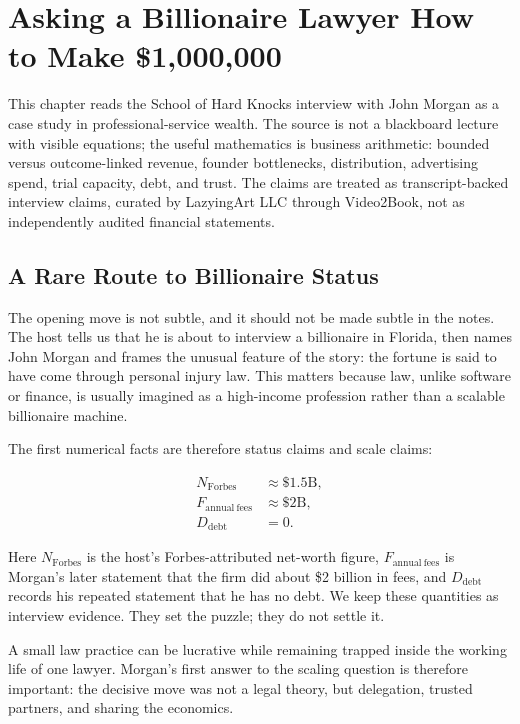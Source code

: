 \chapter{Asking a Billionaire Lawyer How to Make \$1,000,000}

This chapter reads the School of Hard Knocks interview with John Morgan as a case study in professional-service wealth. The source is not a blackboard lecture with visible equations; the useful mathematics is business arithmetic: bounded versus outcome-linked revenue, founder bottlenecks, distribution, advertising spend, trial capacity, debt, and trust. The claims are treated as transcript-backed interview claims, curated by LazyingArt LLC through Video2Book, not as independently audited financial statements.

\section{A Rare Route to Billionaire Status}

The opening move is not subtle, and it should not be made subtle in the notes. The host tells us that he is about to interview a billionaire in Florida, then names John Morgan and frames the unusual feature of the story: the fortune is said to have come through personal injury law. This matters because law, unlike software or finance, is usually imagined as a high-income profession rather than a scalable billionaire machine.

The first numerical facts are therefore status claims and scale claims:

\begin{align}
N_{\mathrm{Forbes}} &\approx \$1.5\mathrm{B},\\
F_{\mathrm{annual\ fees}} &\approx \$2\mathrm{B},\\
D_{\mathrm{debt}} &= 0.
\end{align}

Here \(N_{\mathrm{Forbes}}\) is the host's Forbes-attributed net-worth figure, \(F_{\mathrm{annual\ fees}}\) is Morgan's later statement that the firm did about \$2 billion in fees, and \(D_{\mathrm{debt}}\) records his repeated statement that he has no debt. We keep these quantities as interview evidence. They set the puzzle; they do not settle it.

A small law practice can be lucrative while remaining trapped inside the working life of one lawyer. Morgan's first answer to the scaling question is therefore important: the decisive move was not a legal theory, but delegation, trusted partners, and sharing the economics.

